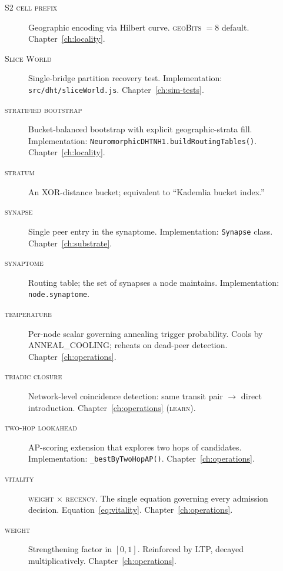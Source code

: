 \documentclass[twoside,nobib]{tufte-book}
\begin{document}
\begin{description}
\item[\textsc{S2 cell prefix}] Geographic encoding via Hilbert
curve. \textsc{geoBits} $= 8$ default.
Chapter~\ref{ch:locality}.

\item[\textsc{Slice World}] Single-bridge partition recovery
test. Implementation: \texttt{src/dht/sliceWorld.js}.
Chapter~\ref{ch:sim-tests}.

\item[\textsc{stratified bootstrap}] Bucket-balanced bootstrap
with explicit geographic-strata fill. Implementation:
\texttt{NeuromorphicDHTNH1.buildRoutingTables()}.
Chapter~\ref{ch:locality}.

\item[\textsc{stratum}] An XOR-distance bucket; equivalent to
``Kademlia bucket index.''

\item[\textsc{synapse}] Single peer entry in the synaptome.
Implementation: \texttt{Synapse} class.
Chapter~\ref{ch:substrate}.

\item[\textsc{synaptome}] Routing table; the set of synapses a
node maintains. Implementation: \texttt{node.synaptome}.

\item[\textsc{temperature}] Per-node scalar governing annealing
trigger probability. Cools by \textsc{ANNEAL\_COOLING};
reheats on dead-peer detection.
Chapter~\ref{ch:operations}.

\item[\textsc{triadic closure}] Network-level coincidence
detection: same transit pair $\to$ direct introduction.
Chapter~\ref{ch:operations} (\textsc{learn}).

\item[\textsc{two-hop lookahead}] AP-scoring extension that
explores two hops of candidates. Implementation:
\texttt{\_bestByTwoHopAP()}. Chapter~\ref{ch:operations}.

\item[\textsc{vitality}] \textsc{weight} $\times$
\textsc{recency}. The single equation governing every
admission decision. Equation~\ref{eq:vitality}.
Chapter~\ref{ch:operations}.

\item[\textsc{weight}] Strengthening factor in $[0, 1]$.
Reinforced by LTP, decayed multiplicatively.
Chapter~\ref{ch:operations}.

\end{description}


\backmatter
\end{document}
